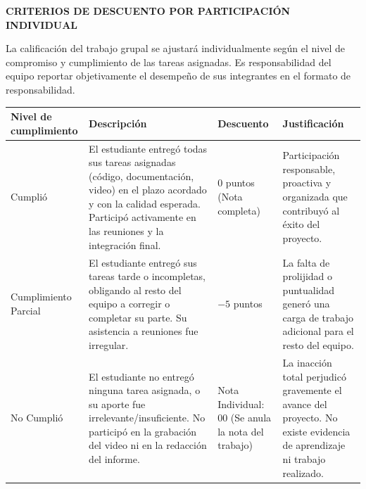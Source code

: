 \documentclass[11pt,a4paper]{article}
\begin{document}
\newpage
\textbf{CRITERIOS DE DESCUENTO POR PARTICIPACIÓN INDIVIDUAL}

La calificación del trabajo grupal se ajustará individualmente según el nivel de compromiso y cumplimiento de las tareas asignadas. Es responsabilidad del equipo reportar objetivamente el desempeño de sus integrantes en el formato de responsabilidad.

{\small
\begin{tabularx}{\textwidth}{|L{2.3cm}|Y|L{2.4cm}|L{4.2cm}|}\hline
\textbf{Nivel de cumplimiento} & \textbf{Descripción} & \textbf{Descuento} & \textbf{Justificación} \\\hline
Cumplió & El estudiante entregó todas sus tareas asignadas (código, documentación, video) en el plazo acordado y con la calidad esperada. Participó activamente en las reuniones y la integración final. & 0 puntos (Nota completa) & Participación responsable, proactiva y organizada que contribuyó al éxito del proyecto. \\\hline
Cumplimiento Parcial & El estudiante entregó sus tareas tarde o incompletas, obligando al resto del equipo a corregir o completar su parte. Su asistencia a reuniones fue irregular. & $-5$ puntos & La falta de prolijidad o puntualidad generó una carga de trabajo adicional para el resto del equipo. \\\hline
No Cumplió & El estudiante no entregó ninguna tarea asignada, o su aporte fue irrelevante/insuficiente. No participó en la grabación del video ni en la redacción del informe. & Nota Individual: 00 (Se anula la nota del trabajo) & La inacción total perjudicó gravemente el avance del proyecto. No existe evidencia de aprendizaje ni trabajo realizado. \\\hline
\end{tabularx}}
\end{document}

